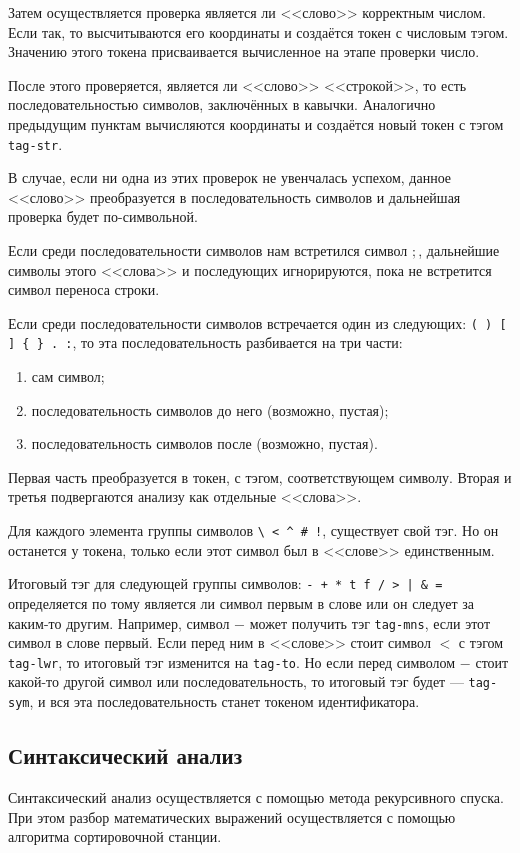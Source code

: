     Затем осуществляется проверка является ли <<слово>> корректным числом.
    Если так, то высчитываются его координаты и создаётся токен с числовым тэгом.
    Значению этого токена присваивается вычисленное на этапе проверки число.

    После этого проверяется, является ли <<слово>> <<строкой>>, то есть последовательностью символов, заключённых в кавычки.
    Аналогично предыдущим пунктам вычисляются координаты и создаётся новый токен с тэгом \verb$tag-str$.

    В случае, если ни одна из этих проверок не увенчалась успехом, данное <<слово>> преобразуется в последовательность символов и дальнейшая проверка будет по-символьной.

    Если среди последовательности символов нам встретился символ $;$, дальнейшие символы этого <<слова>> и последующих игнорируются, пока не встретится символ переноса строки.

    Если среди последовательности символов встречается один из следующих: \verb!( ) [ ] { } . :!, то эта последовательность разбивается на три части:
    \begin{enumerate}
        \item сам символ;
        \item последовательность символов до него (возможно, пустая);
        \item последовательность символов после (возможно, пустая).
    \end{enumerate}
    Первая часть преобразуется в токен, с тэгом, соответствующем символу.
    Вторая и третья подвергаются анализу как отдельные <<слова>>.

    Для каждого элемента группы символов \verb,\ < ^ # !,, существует свой тэг.
    Но он останется у токена, только если этот символ был в <<слове>> единственным.

    Итоговый тэг для следующей группы символов: \verb!- + * t f / > | & =! определяется по тому является ли символ первым в слове или он следует за каким-то другим.
    Например, символ $-$ может получить тэг \verb$tag-mns$, если этот символ в слове первый.
    Если перед ним в <<слове>> стоит символ $<$ с тэгом \verb$tag-lwr$, то итоговый тэг изменится на \verb$tag-to$.
    Но если перед символом $-$ стоит какой-то другой символ или последовательность, то итоговый тэг будет --- \verb$tag-sym$, и вся эта последовательность станет токеном идентификатора.
    
    \subsection{Синтаксический анализ}
    Синтаксический анализ осуществляется с помощью метода рекурсивного спуска.
    При этом разбор математических выражений осуществляется с помощью алгоритма сортировочной станции.
